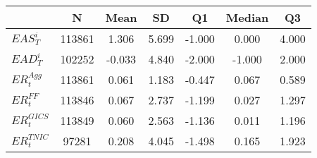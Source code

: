 \begin{tabular}{l*{6}{c}}
\toprule
            &           N&        Mean&          SD&          Q1&      Median&          Q3\\
\midrule
$EAS_{T}^i$&      113861&       1.306&       5.699&      -1.000&       0.000&       4.000\\
$EAD_{T}^i$&      102252&      -0.033&       4.840&      -2.000&      -1.000&       2.000\\
$ER^{Agg}_{t}$  &      113861&       0.061&       1.183&      -0.447&       0.067&       0.589\\
$ER^{FF}_{t}$  &      113846&       0.067&       2.737&      -1.199&       0.027&       1.297\\
$ER^{GICS}_{t}$   &      113849&       0.060&       2.563&      -1.136&       0.011&       1.196\\
$ER^{TNIC}_{t}$  &       97281&       0.208&       4.045&      -1.498&       0.165&       1.923\\
\bottomrule
\end{tabular}

